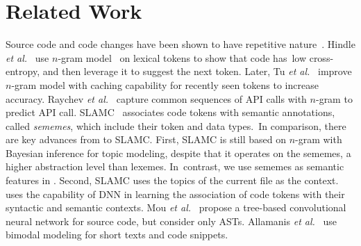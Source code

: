 \section{Related Work}
\label{related}




 Source code and code changes
have been shown to have repetitive
nature~\cite{fse14-barr,gabel-fse10,natural,semdiff}. 
%
%
Hindle {\em et al.}~\cite{natural} use $n$-gram model~\cite{manning99}
on lexical tokens to show that code has~low cross-entropy, and then
leverage it to suggest the next token. Later, Tu {\em et
  al.}~\cite{tu-fse14} improve $n$-gram model with caching capability
for recently seen tokens to increase 
accuracy. Raychev {\em et al.}~\cite{ethz-pldi14} capture common
sequences of API calls with $n$-gram to predict API call.
%
SLAMC~\cite{fse13} associates code tokens with
semantic annotations, called {\em sememes}, which include their token
and data types.~In comparison, there are key advances from {\tool} to
SLAMC. First, SLAMC is still based on $n$-gram with Bayesian
inference for topic modeling, despite that it operates on the sememes,
a higher abstraction level than lexemes.
In~contrast, we use sememes as semantic features in
{\tool}. Second, SLAMC uses the topics of the current file as the
context.
{\tool} uses the capability of DNN in learning the association of code
tokens with their syntactic and semantic contexts.
Mou {\em et al.}~\cite{tbcnn14} propose a
tree-based convolutional neural network for source code, but
consider only ASTs. Allamanis {\em et al.}~\cite{bimodal15} use bimodal
modeling for short texts and code snippets.

